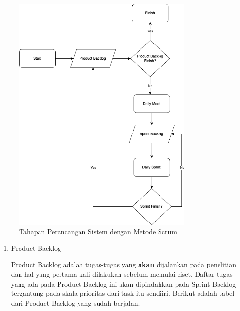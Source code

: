 \begin{spacing}{1.5}
\begin{figure}[H]
	\centering
	\includegraphics[width=0.8\textwidth]{gambar/scrum.png}
	\caption{Tahapan Perancangan Sistem dengan Metode Scrum}
\end{figure}

\begin{enumerate}
	\item Product Backlog
	
	Product Backlog adalah tugas-tugas yang \textbf{akan} dijalankan pada penelitian dan hal yang pertama kali dilakukan sebelum memulai riset. Daftar tugas yang ada pada Product Backlog ini akan dipindahkan pada Sprint Backlog tergantung pada skala prioritas dari task itu sendiiri. Berikut adalah tabel dari Product Backlog yang sudah berjalan.


\end{enumerate}
\end{spacing}
